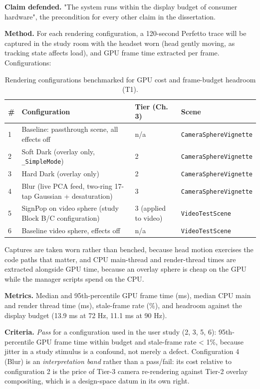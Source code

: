 \textbf{Claim defended.} "The system runs within the display budget of consumer hardware", the
precondition for every other claim in the dissertation.

\textbf{Method.} For each rendering configuration, a 120-second Perfetto trace will be captured in the
study room with the headset worn (head gently moving, as tracking state affects load), and GPU
frame time extracted per frame. Configurations:

\begin{longtable}{p{}|p{}|p{}|p{}}
\caption{Rendering configurations benchmarked for GPU cost and frame-budget headroom (T1).}\\
\hline
\textbf{\#} & \textbf{Configuration} & \textbf{Tier (Ch. 3)} & \textbf{Scene} \\
\hline
\endhead
\hline
1 & Baseline: passthrough scene, all effects off & n/a & \verb|CameraSphereVignette| \\
2 & Soft Dark (overlay only, \verb|_SimpleMode|) & 2 & \verb|CameraSphereVignette| \\
3 & Hard Dark (overlay only) & 2 & \verb|CameraSphereVignette| \\
4 & Blur (live PCA feed, two-ring 17-tap Gaussian + desaturation) & 3 & \verb|CameraSphereVignette| \\
5 & SignPop on video sphere (study Block B/C configuration) & 3 (applied to video) & \verb|VideoTestScene| \\
6 & Baseline video sphere, effects off & n/a & \verb|VideoTestScene| \\
\hline
\end{longtable}

Captures are taken worn rather than benched, because head motion exercises the code paths that
matter, and CPU main-thread and render-thread times are extracted alongside GPU time, because an
overlay sphere is cheap on the GPU while the manager scripts spend on the CPU.

\textbf{Metrics.} Median and 95th-percentile GPU frame time (ms), median CPU main and render thread
time (ms), stale-frame rate (\%), and headroom against the display budget (13.9 ms at 72 Hz, 11.1 ms
at 90 Hz).

\textbf{Criteria.} \textit{Pass} for a configuration used in the user study (2, 3, 5, 6): 95th-percentile GPU
frame time within budget and stale-frame rate < 1\%, because jitter in a study stimulus is a
confound, not merely a defect. Configuration 4 (Blur) is an \textit{interpretation band} rather than a
pass/fail: its cost relative to configuration 2 is the price of Tier-3 camera re-rendering against
Tier-2 overlay compositing, which is a design-space datum in its own right.

